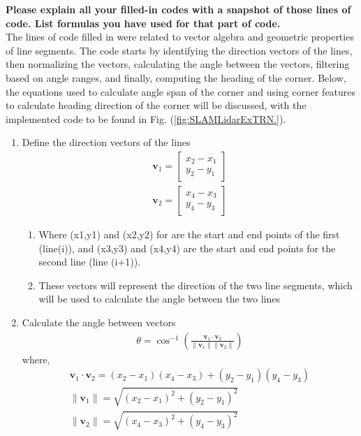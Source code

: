 \textbf{Please explain all your filled-in codes with a snapshot of those lines of code. List formulas you have used for that part of code.}\\
The lines of code filled in were related to vector algebra and geometric properties of line segments. The code starts by identifying the direction vectors of the lines, then normalizing the vectors, calculating the angle between the vectors, filtering based on angle ranges, and finally, computing the heading of the corner. Below, the equations used to calculate angle span of the corner and using corner features to calculate heading direction of the corner will be discussed, with the implemented code to be found in Fig. (\ref{fig:SLAMLidarExTRN.}).
\begin{enumerate}
    \item Define the direction vectors of the lines
    \begin{align}
     \mathbf{v}_1 = \begin{bmatrix} x_2 - x_1 \\ y_2 - y_1 \end{bmatrix}\\
     \mathbf{v}_2 = \begin{bmatrix} x_4 - x_3 \\ y_4 - y_3 \end{bmatrix}
    \end{align}
    \begin{enumerate}
        \item Where (x1,y1) and (x2,y2) for are the start and end points of the first (line(i)), and (x3,y3) and (x4,y4) are the start and end points for the second line (line (i+1)).
        \item These vectors will represent the direction of the two line segments, which will be used to calculate the angle between the two lines
    \end{enumerate}
    \item Calculate the angle between vectors
    \begin{align}
    \theta = \cos^{-1} \left( \frac{\mathbf{v}_1 \cdot \mathbf{v}_2}{\|\mathbf{v}_1\| \|\mathbf{v}_2\|} \right)
    \end{align}
    where,
    \begin{align*}
    \mathbf{v}_1 \cdot \mathbf{v}_2 = (x_2 - x_1)(x_4 - x_3) + (y_2 - y_1)(y_4 - y_3)\\
    \|\mathbf{v}_1\| = \sqrt{(x_2 - x_1)^2 + (y_2 - y_1)^2}\\        \|\mathbf{v}_2\| = \sqrt{(x_4 - x_3)^2 + (y_4 - y_3)^2}

\end{align*}
\end{enumerate}
